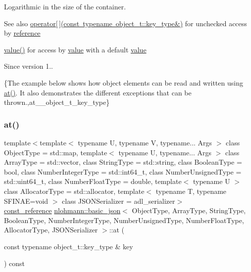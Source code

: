 Logarithmic in the size of the container.

\begin{DoxySeeAlso}{See also}
\mbox{\hyperlink{classnlohmann_1_1basic__json_a233b02b0839ef798942dd46157cc0fe6}{operator\mbox{[}$\,$\mbox{]}(const typename object\+\_\+t\+::key\+\_\+type\&)}} for unchecked access by \mbox{\hyperlink{classnlohmann_1_1basic__json_ac6a5eddd156c776ac75ff54cfe54a5bc}{reference}} 

\mbox{\hyperlink{classnlohmann_1_1basic__json_adcf8ca5079f5db993820bf50036bf45d}{value()}} for access by \mbox{\hyperlink{classnlohmann_1_1basic__json_adcf8ca5079f5db993820bf50036bf45d}{value}} with a default \mbox{\hyperlink{classnlohmann_1_1basic__json_adcf8ca5079f5db993820bf50036bf45d}{value}}
\end{DoxySeeAlso}
\begin{DoxySince}{Since}
version 1..
\end{DoxySince}
\{The example below shows how object elements can be read and written using {\ttfamily \mbox{\hyperlink{classnlohmann_1_1basic__json_a73ae333487310e3302135189ce8ff5d8}{at()}}}. It also demonstrates the different exceptions that can be thrown.,at\+\_\+\+\_\+object\+\_\+t\+\_\+key\+\_\+type\} \mbox{\label{classnlohmann_1_1basic__json_acac9d438c9bb12740dcdb01069293a34}} 
\subsubsection{\texorpdfstring{at()}{at()}\hspace{0.1cm}{\footnotesize\ttfamily [4/6]}}
{\footnotesize\ttfamily template$<$template$<$ typename U, typename V, typename... Args $>$ class Object\+Type = std\+::map, template$<$ typename U, typename... Args $>$ class Array\+Type = std\+::vector, class String\+Type  = std\+::string, class Boolean\+Type  = bool, class Number\+Integer\+Type  = std\+::int64\+\_\+t, class Number\+Unsigned\+Type  = std\+::uint64\+\_\+t, class Number\+Float\+Type  = double, template$<$ typename U $>$ class Allocator\+Type = std\+::allocator, template$<$ typename T, typename S\+F\+I\+N\+A\+E=void $>$ class J\+S\+O\+N\+Serializer = adl\+\_\+serializer$>$ \\
\mbox{\hyperlink{classnlohmann_1_1basic__json_a4057c5425f4faacfe39a8046871786ca}{const\+\_\+reference}} \mbox{\hyperlink{classnlohmann_1_1basic__json}{nlohmann\+::basic\+\_\+json}}$<$ Object\+Type, Array\+Type, String\+Type, Boolean\+Type, Number\+Integer\+Type, Number\+Unsigned\+Type, Number\+Float\+Type, Allocator\+Type, J\+S\+O\+N\+Serializer $>$\+::at (\begin{DoxyParamCaption}\item[{const typename object\+\_\+t\+::key\+\_\+type \&}]{key }\end{DoxyParamCaption}) const\hspace{0.3cm}{\ttfamily [inline]}}



